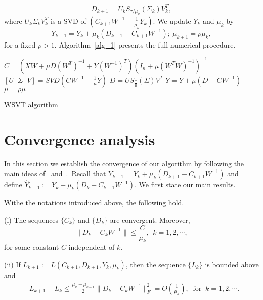 \documentclass[twoside,11pt]{article}
\begin{document}
\begin{equation*}
D_{k+1}=U_kS_{\tau/\mu_k}(\Sigma_k)V_k^T,
\end{equation*}
where $U_k\Sigma_kV_k^T$ is a SVD of $(C_{k+1}W^{-1}-\frac{1}{\mu_k}Y_k)$.
We update $Y_k$ and $\mu_k$ by %
\begin{equation*}
Y_{k+1}=Y_k+\mu_k (D_{k+1}-C_{k+1}W^{-1}); ~\mu_{k+1}=\rho\mu_k,
\end{equation*}
for a fixed $\rho>1$. Algorithm~\ref{alg_1} presents the full numerical procedure.
\begin{algorithm}
	\SetAlgoLined
	\nl{}
     \nl{}
	\BlankLine
	\nl {}
	{
		\nl $C = (XW + \mu{D} (W^T)^{-1}+Y(W^{-1})^T)(I_n + \mu(W^TW)^{-1})^{-1}$\;
		\nl $[U\;\;\Sigma\;\;V] = SVD(CW^{-1} -\frac{1}{\mu}Y)$\;
		\nl $D = US_{\frac{\tau}{\mu}}(\Sigma)V^T$\;
		\nl $Y = Y+\mu(D-CW^{-1})$\;
		\nl $\mu = \rho\mu$\;
	}
	\BlankLine
	\nl {}
	\caption{WSVT algorithm} \label{alg_1}
\end{algorithm}

\section{Convergence analysis}

{I}{n} this section we establish the convergence of our algorithm by following the main ideas of~\citet{LinChenMa} and~\citet{LiOreifej}.~Recall that $Y_{k+1}= Y_k+\mu_k(D_{k+1}-C_{k+1}W^{-1})$ and define ${\hat{Y}_{k+1}}:=Y_k+\mu_k(D_{k}-C_{k+1}W^{-1})$. We first state our main results. 
\begin{theorem}\label{theorem_3_3}
	Withe the notations introduced above, the following hold. 
	\begin{description}
		\item{(i)} The sequences $\{C_k\}$ and $\{D_k\}$ are convergent. Moreover,  $$
		\|D_k-C_kW^{-1}\|\le \frac{C}{\mu_k},~~k = 1,2,\cdots,$$ for some constant $C$ independent of $k$.
		\item{(ii)} If $L_{k+1} := L(C_{k+1},D_{k+1},Y_k,\mu_k)$, then the sequence $\{L_k\}$ is bounded above and 
		\begin{align*}
		& L_{k+1}-L_k \le \frac{\mu_k +\mu_{k-1}}{2}\|D_k-C_kW^{-1}\|_F^2=O(\frac{1}{\mu_k}),
		\;\;\text{for}\;\;k = 1,2,\cdots.
		\end{align*}
	\end{description}
\end{theorem}
\end{document}
